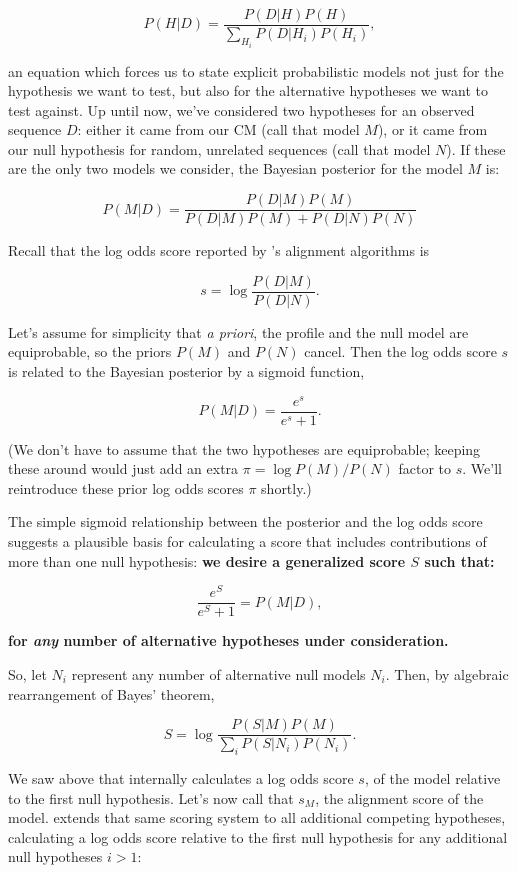 \[
   P(H | D) = \frac{P(D | H) P(H)}{\sum_{H_i} P(D | H_i) P(H_i)},
\]

an equation which forces us to state explicit probabilistic models not
just for the hypothesis we want to test, but also for the alternative
hypotheses we want to test against. Up until now, we've considered two
hypotheses for an observed sequence $D$: either it came from our
CM (call that model $M$), or it came from our null hypothesis
for random, unrelated sequences (call that model $N$). If these are
the only two models we consider, the Bayesian posterior for the model
$M$ is:

\[
   P(M | D) = \frac{P(D | M) P(M)}{P(D | M) P(M) + P(D | N) P(N)}
\]

Recall that the log odds score reported by 's alignment
algorithms is

\[
  s = \log \frac{P(D | M)}{P(D | N)}.
\]

Let's assume for simplicity that \emph{a priori}, the profile and the
null model are equiprobable, so the priors $P(M)$ and $P(N)$
cancel. Then the log odds score $s$ is related to the Bayesian
posterior by a sigmoid function,

\[
  P(M | D) = \frac{e^s}{e^s + 1}.
\]

(We don't have to assume that the two hypotheses are equiprobable;
keeping these around would just add an extra $\pi = \log P(M) / P(N)$
factor to $s$. We'll reintroduce these prior log odds scores $\pi$
shortly.)

The simple sigmoid relationship between the posterior and the log odds
score suggests a plausible basis for calculating a score that includes
contributions of more than one null hypothesis: \textbf{we desire a
generalized score $S$ such that:}

\[
  \frac{e^S}{e^S + 1} = P(M | D),
\]

\textbf{for \emph{any} number of alternative hypotheses under consideration.}

So, let $N_i$ represent any number of alternative null models
$N_i$. Then, by algebraic rearrangement of Bayes' theorem,

\[
   S = \log \frac{P(S | M) P(M)}{ \sum_{i} P(S | N_i) P(N_i)}. 
\]

We saw above that  internally calculates a log odds score $s$, of
the model relative to the first null hypothesis. Let's now call that
$s_M$, the alignment score of the model.  extends that same
scoring system to all additional competing hypotheses, calculating a
log odds score relative to the first null hypothesis for any
additional null hypotheses $i > 1$:


